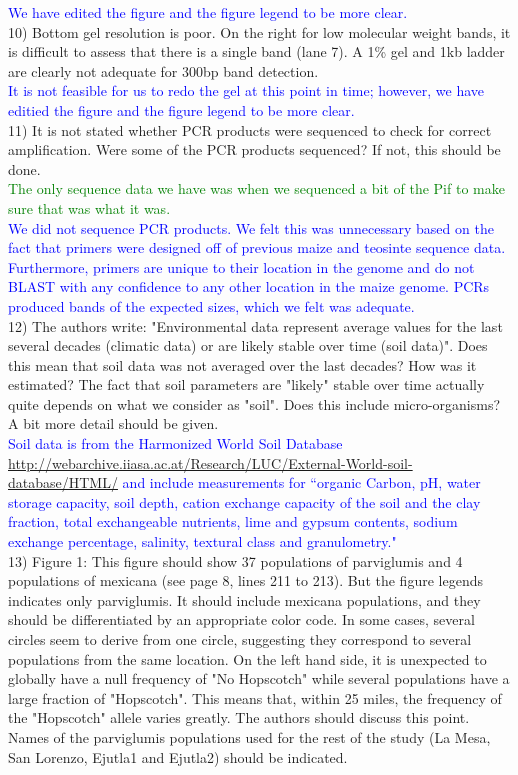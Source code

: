 \documentclass[11pt]{article}
\newcommand{\res}[1]{\noindent \textcolor{blue}{{#1}} \\}
\newcommand{\lev}[1]{\noindent \textcolor{green}{{#1}} \\}
\begin{document}
\res{We have edited the figure and the figure legend to be more clear.}

10) Bottom gel resolution is poor. On the right for low molecular weight bands, it is difficult to assess that there is a single band (lane 7). A 1\% gel and 1kb ladder are clearly not adequate for 300bp band detection.\\

\res{It is not feasible for us to redo the gel at this point in time; however, we have editied the figure and the figure legend to be more clear.}

11) It is not stated whether PCR products were sequenced to check for correct amplification. Were some of the PCR products sequenced? If not, this should be done.\\

\lev{The only sequence data we have was when we sequenced a bit of the Pif to make sure that was what it was.}

\res{We did not sequence PCR products. We felt this was unnecessary based on the fact that primers were designed off of previous maize and teosinte sequence data. Furthermore, primers are unique to their location in the genome and do not BLAST with any confidence to any other location in the maize genome. PCRs produced bands of the expected sizes, which we felt was adequate.}

12) The authors write: "Environmental data represent average values for the last several decades (climatic data) or are likely stable over time (soil data)". Does this mean that soil data was not averaged over the last decades? How was it estimated? The fact that soil parameters are "likely" stable over time actually quite depends on what we consider as "soil". Does this include micro-organisms? A bit more detail should be given.\\

\res{Soil data is from the Harmonized World Soil Database \url{http://webarchive.iiasa.ac.at/Research/LUC/External-World-soil-database/HTML/} and include measurements for ``organic Carbon, pH, water storage capacity, soil depth, cation exchange capacity of the soil and the clay fraction, total exchangeable nutrients, lime and gypsum contents, sodium exchange percentage, salinity, textural class and granulometry."}

13) Figure 1: This figure should show 37 populations of parviglumis and 4 populations of mexicana (see page 8, lines 211 to 213). But the figure legends indicates only parviglumis. It should include mexicana populations, and they should be differentiated by an appropriate color code. In some cases, several circles seem to derive from one circle, suggesting they correspond to several populations from the same location. On the left hand side, it is unexpected to globally have a null frequency of "No Hopscotch" while several populations have a large fraction of "Hopscotch". This means that, within 25 miles, the frequency of the "Hopscotch" allele varies greatly. The authors should discuss this point. Names of the parviglumis populations used for the rest of the study (La Mesa, San Lorenzo, Ejutla1 and Ejutla2) should be indicated.\\
\end{document}
